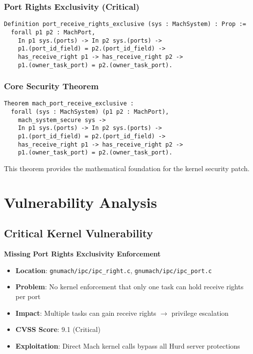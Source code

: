 \documentclass[11pt,a4paper]{article}
\begin{document}
\subsubsection{Port Rights Exclusivity (Critical)}

\begin{lstlisting}[style=coqstyle, caption=Port Rights Exclusivity Property]
Definition port_receive_rights_exclusive (sys : MachSystem) : Prop :=
  forall p1 p2 : MachPort,
    In p1 sys.(ports) -> In p2 sys.(ports) ->
    p1.(port_id_field) = p2.(port_id_field) ->
    has_receive_right p1 -> has_receive_right p2 ->
    p1.(owner_task_port) = p2.(owner_task_port).
\end{lstlisting}

\subsubsection{Core Security Theorem}

\begin{lstlisting}[style=coqstyle, caption=Mach Port Receive Exclusivity Theorem]
Theorem mach_port_receive_exclusive : 
  forall (sys : MachSystem) (p1 p2 : MachPort),
    mach_system_secure sys ->
    In p1 sys.(ports) -> In p2 sys.(ports) ->
    p1.(port_id_field) = p2.(port_id_field) ->
    has_receive_right p1 -> has_receive_right p2 ->
    p1.(owner_task_port) = p2.(owner_task_port).
\end{lstlisting}

This theorem provides the mathematical foundation for the kernel security patch.

\section{Vulnerability Analysis}

\subsection{Critical Kernel Vulnerability}

\textbf{Missing Port Rights Exclusivity Enforcement}

\begin{itemize}
    \item \textbf{Location}: \texttt{gnumach/ipc/ipc\_right.c}, \texttt{gnumach/ipc/ipc\_port.c}
    \item \textbf{Problem}: No kernel enforcement that only one task can hold receive rights per port
    \item \textbf{Impact}: Multiple tasks can gain receive rights $\rightarrow$ privilege escalation
    \item \textbf{CVSS Score}: \textcolor{criticalred}{9.1 (Critical)}
    \item \textbf{Exploitation}: Direct Mach kernel calls bypass all Hurd server protections
\end{itemize}
\end{document}
